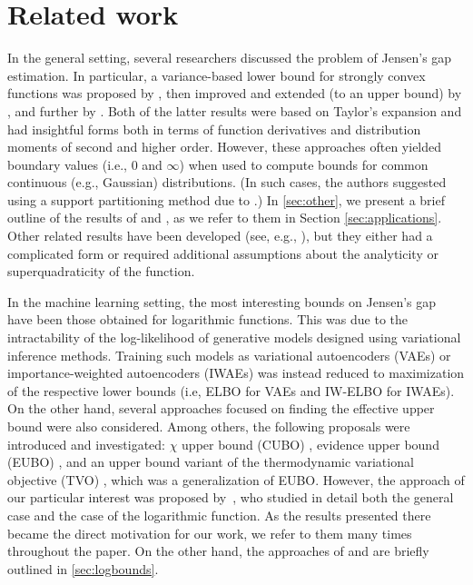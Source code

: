 \section{Related work}
\label{sec:relwork}

In the general setting, several researchers discussed the problem of Jen\-sen's gap estimation. 
In particular, a variance-based lower bound for strongly convex functions was proposed by \citet{bakula2016converse}, then improved and extended (to an upper bound) by \citet{liao2019sharpening}, and further by \citet{lee2021further}. Both of the latter results were based on Taylor's expansion and had insightful forms both in terms of function derivatives and distribution moments of second and higher order. However, these approaches often yielded boundary values (i.e., 0 and $\infty$) when used to compute bounds for common continuous (e.g., Gaussian) distributions. (In such cases, the authors suggested using a support partitioning method due to \citet{walker2014lower}.) In \ref{sec:other}, we present a brief outline of the results of \citet{liao2019sharpening} and \citet{lee2021further}, as we refer to them in Section \ref{sec:applications}.
Other related results have been developed (see, e.g., \citep{abramovich2004refining,dragomir2001some,dragomir2015inequality,horvath2014refinement,pecaric1985companion,walker2014lower,lovrivcevic2018zipf,banic2008superquadratic}), but they either had a complicated form or required additional assumptions about the analyticity or superquadraticity of the function.

In the machine learning setting, the most interesting bounds on Jensen's gap have been those obtained for logarithmic functions. This was due to the intractability of the log-likelihood of generative models designed using variational inference methods. Training such models as variational autoencoders (VAEs) \citep{kingma2013auto,rezende2015variational} or importance-weighted autoencoders (IWAEs) \citep{burda2015importance} was instead reduced to maximization of the respective lower bounds (i.e, ELBO for VAEs and IW-ELBO for IWAEs). On the other hand, several approaches focused on finding the effective upper bound were also considered. Among others, the following proposals were introduced and investigated: $\chi$ upper bound (CUBO) \citep{dieng2017variational}, evidence upper bound (EUBO) \citep{ji2019stochastic}, and an upper bound variant of the thermodynamic variational objective (TVO) \citep{masrani2019thermodynamic}, which was a generalization of EUBO. However, the approach of our particular interest was proposed by~\citet{pmlr-v206-struski23a}, who studied in detail both the general case and the case of the logarithmic function. As the results presented there became the direct motivation for our work, we refer to them many times throughout the paper. On the other hand, the approaches of \citet{dieng2017variational,ji2019stochastic} and \citet{masrani2019thermodynamic} are briefly outlined in \ref{sec:logbounds}.